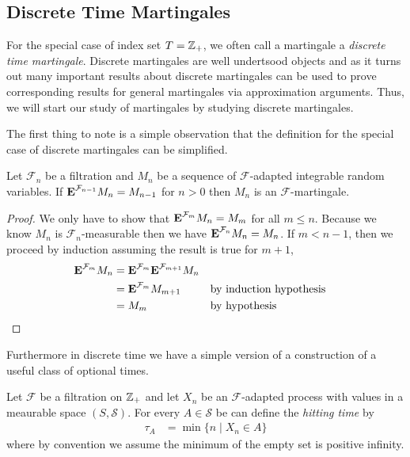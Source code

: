 \subsection{Discrete Time Martingales}
For the special case of index set $T = \mathbb{Z}_+$, we often call a
martingale a \emph{discrete time martingale}.  Discrete martingales are well
undertsood objects and as it turns out many important results about discrete
martingales can be used to prove corresponding results for general martingales via approximation
arguments.  Thus, we will start our study of martingales by studying
discrete martingales.

The first thing to note is a simple observation that the definition
for the special case of discrete martingales can be simplified.
\begin{lem}Let $\mathcal{F}_n$ be a filtration and $M_n$ be a sequence
  of $\mathcal{F}$-adapted integrable random variables.  If
  $\textbf{E}^{\mathcal{F}_{n-1}} M_n = M_{n-1}$ for $n > 0$ then $M_n$
  is an $\mathcal{F}$-martingale.
\end{lem}
\begin{proof}We only have to show that
  $\textbf{E}^{\mathcal{F}_m} M_n = M_m$ for all $m \leq n$.
  Because we know $M_n$ is $\mathcal{F}_n$-measurable then we have
  $\textbf{E}^{\mathcal{F}_n} M_n = M_n$.  If $m < n-1$, then we
  proceed by induction
  assuming the result is true for $m+1$,
\begin{align*}
\textbf{E}^{\mathcal{F}_m} M_n &=
\textbf{E}^{\mathcal{F}_m} \textbf{E}^{\mathcal{F}_{m+1}} M_n \\
&=\textbf{E}^{\mathcal{F}_m} M_{m+1} & & \text{by induction hypothesis}\\
&= M_m & & \text{by hypothesis}
\end{align*}
\end{proof}

Furthermore in discrete time we have a simple version of a
construction of a useful class of optional times.
\begin{defn}Let $\mathcal{F}$ be a filtration on $\mathbb{Z}_+$ and let
  $X_n$ be an $\mathcal{F}$-adapted process with values in a meaurable
  space $(S, \mathcal{S})$.  For every $A \in \mathcal{S}$ be can
  define the \emph{hitting time} by
\begin{align*}
\tau_A &= \min \lbrace n \mid X_n \in A \rbrace
\end{align*}
where by convention we assume the minimum of the empty set is positive infinity.
\end{defn}

